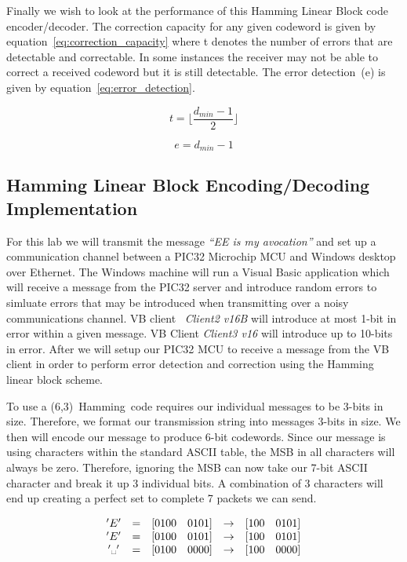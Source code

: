 \documentclass[12pt]{article}
\begin{document}
Finally we wish to look at the performance of this Hamming Linear Block code
encoder/decoder. The correction capacity for any given codeword is given by
equation~\ref{eq:correction_capacity} where t denotes the number of 
errors that are detectable and correctable. In some instances the receiver may
not be able to correct a received codeword but it is still detectable. 
The error detection~(e) is given by equation~\ref{eq:error_detection}.

\begin{equation}
    t=\lfloor{\frac{d_{min}-1}{2}}\rfloor
    \label{eq:correction_capacity}   
\end{equation}

\begin{equation}
    e={d_{min}-1}
    \label{eq:error_detection}   
\end{equation}

\subsection{Hamming Linear Block Encoding/Decoding Implementation}
For this lab we will transmit the message \textit{``EE is my avocation''} 
and set up a communication channel between a PIC32 Microchip MCU and 
Windows desktop over Ethernet. The Windows machine will run a Visual Basic 
application which will receive a message from the PIC32 server and 
introduce random errors to simluate errors that may be introduced
when transmitting over a noisy communications channel. VB client \
\textit{Client2 v16B} will introduce at most 1-bit in error within a given
message. VB Client \textit{Client3 v16} will introduce up to 10-bits in 
error. After we will setup our PIC32 MCU to receive a message from the VB 
client in order to perform error detection and correction using the Hamming 
linear block scheme.

To use a (6,3)~Hamming~code requires our individual messages to be 3-bits in
size. Therefore, we format our transmission string into messages 3-bits in 
size. We then will encode our message to produce 6-bit codewords. Since
our message is using characters within the standard ASCII table, the MSB in 
all characters will always be zero. Therefore, ignoring the MSB can now take 
our 7-bit ASCII character and break it up 3 individual bits. A combination 
of 3 characters will end up creating a perfect set to complete 7 packets 
we can send. 

$$
    \begin{array}{ccccc}
        'E' & = & [ 0 1 0 0 \quad 0 1 0 1] 
                & \rightarrow & [ 1 0 0 \quad 0 1 0 1] \\
        'E' & = & [ 0 1 0 0 \quad 0 1 0 1] 
                & \rightarrow & [ 1 0 0 \quad 0 1 0 1] \\
        '\text{\textvisiblespace }' & = & [ 0 1 0 0 \quad 0 0 0 0] 
                                    & \rightarrow
                                    & [ 1 0 0 \quad 0 0 0 0 ]
    \end{array}
$$
\end{document}
